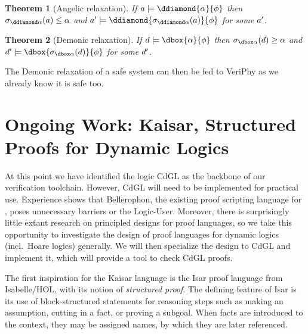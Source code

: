 \documentclass[12pt]{cmuthesis}
\newtheorem{theorem}{Theorem}
\theoremstyle{definition}
\theoremstyle{remark}
\newcommand{\CdGL}{\textsf{CdGL}\xspace}
\newcommand{\VeriPhy}{VeriPhy\xspace}
\begin{document}
\begin{theorem}[Angelic relaxation]
  If $\aa \models \ddiamond{\alpha}{\phi}$ then $\ainline{\alpha}{\aa} \leq \alpha$ and $\aa' \models \ddiamond{\ainline{\alpha}{\aa}}{\phi}$ for some $\aa'$.
\end{theorem}
\begin{theorem}[Demonic relaxation]
  If $\da \models \dbox{\alpha}{\phi}$ then $\dinline{\alpha}{\da} \geq \alpha$ and $\da' \models \dbox{\dinline{\alpha}{\da}}{\phi}$ for some $\da'$.
\end{theorem}

The Demonic relaxation of a safe system can then be fed to \VeriPhy as we already know it is safe too.


\chapter{Ongoing Work: Kaisar, Structured Proofs for Dynamic Logics}
\label{ch:kaisar}
At this point we have identified the logic \CdGL as the backbone of our verification toolchain.
However, \CdGL will need to be implemented for practical use.
Experience shows that Bellerophon, the existing proof scripting language for \dGL, poses unnecessary barriers or the Logic-User.
Moreover, there is surprisingly little extant research on principled designs for proof languages, so we take this opportunity to investigate the design of proof languages for dynamic logics (incl.\ Hoare logics) generally.
We will then specialize the design to \CdGL and implement it, which will provide a tool to check \CdGL proofs.

The first inspiration for the Kaisar language is the Isar proof language from Isabelle/HOL, with its notion of \emph{structured proof}.
The defining feature of Isar is its use of block-structured statements for reasoning steps such as making an assumption, cutting in a fact, or proving a subgoal.
When facts are introduced to the context, they may be assigned names, by which they are later referenced.
\end{document}
